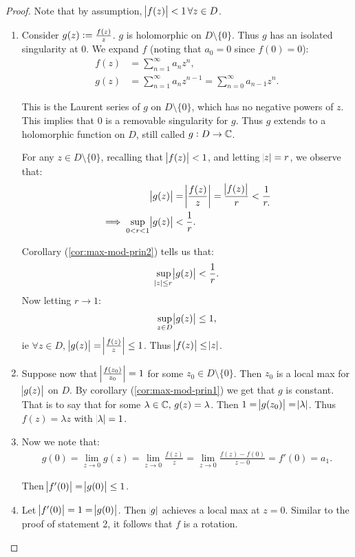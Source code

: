 \begin{proof}
Note that by assumption, $\abs{f(z)} < 1  \, \forall z \in D$.
\begin{enumerate}
    \item Consider $g(z) \vcentcolon = \frac{f(z)}{z}$. $g$ is holomorphic on $D \setminus \{ 0 \}$. Thus $g$ has an isolated singularity at $0$. We expand $f$ (noting that $a_0 = 0$ since $f(0) = 0$):
\begin{align*}
    f(z) &= \sum_{n=1}^\infty a_n z^n,\\
    g(z) &= \sum_{n=1}^\infty a_n z^{n-1} = \sum_{n=0}^\infty a_{n-1} z^{n}.
\end{align*}

This is the Laurent series of $g$ on $D \setminus \{ 0 \}$, which has no negative powers of $z$. This implies that $0 $ is a removable singularity for $g$. Thus $g$ extends to a holomorphic function on $D$, still called $g: D \to \mathbb{C}$.

For any $z \in D \setminus \{ 0 \}$, recalling that $\abs{f(z)} < 1$, and letting $\abs{z} = r$, we observe that:
\begin{align*}
    &\abs{g(z)} = \abs{\frac{f(z)}{z}} = \frac{\abs{f(z)}}{r} < \frac{1}{r.}\\
    \implies \sup_{0 < r < 1} &\abs{g(z)} < \frac{1}{r}.
\end{align*}

Corollary (\ref{cor:max-mod-prin2}) tells us that:
\begin{align*}
    \sup_{\abs{z} \leq r} \abs{g(z)} < \frac{1}{r}.
\end{align*}
Now letting $r \to 1$:
\begin{align*}
    \sup_{z \in D} \abs{g(z)} \leq 1,
\end{align*}
ie $\forall z \in D$, $\abs{g (z) } = \abs{ \frac{f(z)}{ z }} \leq 1$. Thus $\abs{f(z)} \leq \abs{z}$.


\item Suppose now that $\abs{ \frac{f(z_0)}{z_0} } = 1$ for some $z_0 \in D \setminus \{ 0 \}$. Then $z_0$ is a local max for $\abs{g(z)}$ on $D$. By corollary (\ref{cor:max-mod-prin1}) we get that $g$ is constant. That is to say that for some $\lambda \in \mathbb{C}, \, g(z) = \lambda$. Then $1 = \abs{g(z_0) } = \abs{\lambda}$. Thus $f (z) = \lambda z$ with $\abs{\lambda} = 1$.

\item Now we note that:
\begin{align*}
    g(0) = \lim_{z \to 0} g(z) = \lim_{z \to 0} \frac{f(z)}{z} = \lim_{z \to 0} \frac{f(z) - f(0)}{z - 0} = f'(0) = a_1.
\end{align*}

Then $\abs{f'(0)} = \abs{g(0) } \leq 1$.


\item Let $\abs{f'(0) } = 1 = \abs{g(0)}$. Then $\abs{g}$ achieves a local max at $z = 0$. Similar to the proof of statement 2, it follows that $f$ is a rotation.
\end{enumerate}
\end{proof}

